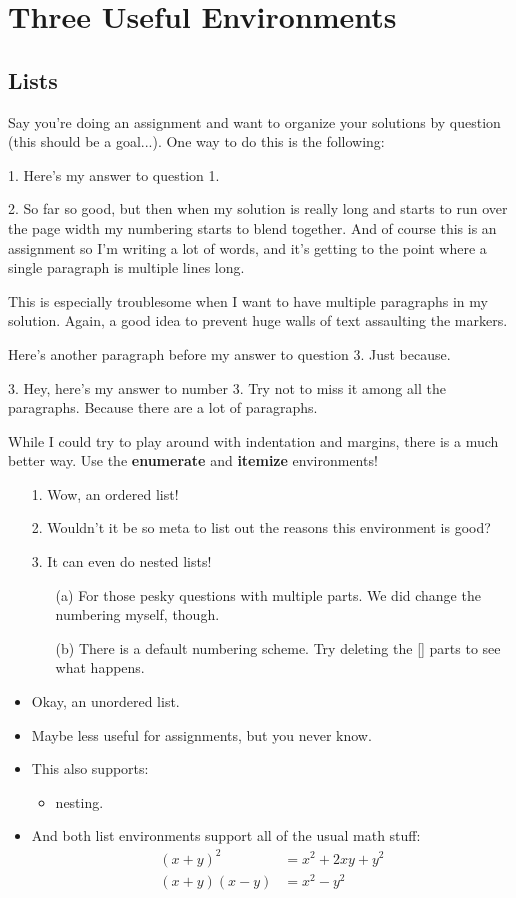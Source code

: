 \documentclass[12pt]{article}
\begin{document}
\newpage

\section{Three Useful Environments}
\subsection{Lists}
Say you're doing an assignment and want to organize your solutions by question (this should be a goal...). One way to do this is the following:

1. Here's my answer to question 1.

2. So far so good, but then when my solution is really long and starts to run over the page width my numbering starts to blend together. And of course this is an assignment so I'm writing a lot of words, and it's getting to the point where a single paragraph is multiple lines long.

This is especially troublesome when I want to have multiple paragraphs in my solution. Again, a good idea to prevent huge walls of text assaulting the markers.

Here's another paragraph before my answer to question 3. Just because.

3. Hey, here's my answer to number 3. Try not to miss it among all the paragraphs. Because there are a lot of paragraphs.

While I could try to play around with indentation and margins, there is a much better way. Use the \textbf{enumerate} and \textbf{itemize} environments!

\begin{enumerate}
\item[1.] Wow, an ordered list!
\item[2.] Wouldn't it be so meta to list out the reasons this environment is good?
\item[3.] It can even do nested lists!
	\begin{enumerate}
	\item[(a)] For those pesky questions with multiple parts. We did change the numbering myself, though.
	\item[(b)] There is a default numbering scheme. Try deleting the [] parts to see what happens.
	\end{enumerate}
\end{enumerate}

\begin{itemize}
\item Okay, an unordered list.
\item Maybe less useful for assignments, but you never know.
\item This also supports:
	\begin{itemize}
	\item nesting.
	\end{itemize}
\item And both list environments support all of the usual math stuff:
\begin{align*}
(x + y)^2 &= x^2 + 2xy + y^2 \\
(x + y)(x - y) &= x^2 - y^2
\end{align*}
\end{itemize}
\end{document}
